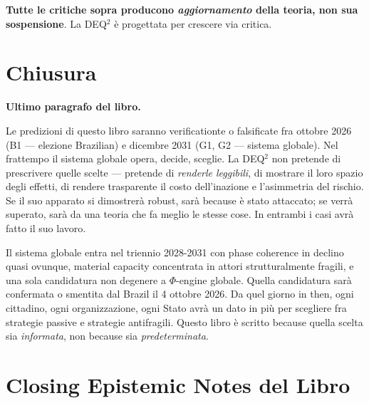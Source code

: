 \Proved{} \textbf{Tutte le critiche sopra producono \emph{aggiornamento}
della teoria, non sua sospensione}. La DEQ$^2$ è progettata per crescere
via critica.



\section{Chiusura}\label{chiusura}

\Hypoth{} \textbf{Ultimo paragrafo del libro.}

Le predizioni di questo libro saranno verificationte o falsificate fra
ottobre 2026 (B1 --- elezione Brazilian) e dicembre 2031 (G1, G2 ---
sistema globale). Nel frattempo il sistema globale opera, decide,
sceglie. La DEQ$^2$ non pretende di prescrivere quelle scelte --- pretende
di \emph{renderle leggibili}, di mostrare il loro spazio degli effetti,
di rendere trasparente il costo dell'inazione e l'asimmetria del
rischio. Se il suo apparato si dimostrerà robust, sarà because è stato
attaccato; se verrà superato, sarà da una teoria che fa meglio le stesse
cose. In entrambi i casi avrà fatto il suo lavoro.

Il sistema globale entra nel triennio 2028-2031 con phase coherence in
declino quasi ovunque, material capacity concentrata in attori
strutturalmente fragili, e una sola candidatura non degenere a
\(\Phi\)-engine globale. Quella candidatura sarà confermata o smentita
dal Brazil il 4 ottobre 2026. Da quel giorno in then, ogni cittadino,
ogni organizzazione, ogni Stato avrà un dato in più per scegliere fra
strategie passive e strategie antifragili. Questo libro è scritto because
quella scelta sia \emph{informata}, non because sia
\emph{predeterminata}.



\section{Closing Epistemic Notes del
Libro}\label{note-epistemiche-di-chiusura-del-libro}

